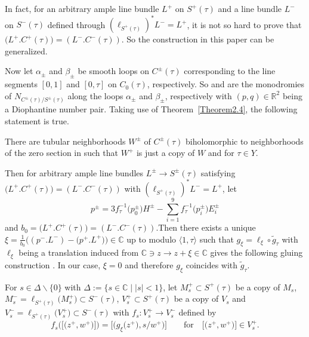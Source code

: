 \documentclass[10pt,a4paper]{amsart}
\numberwithin{equation}{section}
\begin{document}
In fact, for an arbitrary ample line bundle $L^+$ on $S^+(\tau)$ and a line bundle $L^-$ on $S^-(\tau)$ defined through $(\ell_{S^{+}(\tau)})^*L^{-}=L^{+}$, it is not so hard to prove that $\bigl(L^{+}.C^{+}(\tau)\bigr)=(L^{-}.C^{-}(\tau))$. So the construction in this paper can be generalized.

Now let $\alpha_{\pm}$ and $\beta_{\pm}$ be smooth loops on $C^{\pm}(\tau)$ corresponding to the line segments $[0,1]$ and $[0,\tau]$ on $C_0(\tau)$, respectively. So  and  are the monodromies of $N_{C^{\pm}(\tau)/S^{\pm}(\tau)}$ along the loops $\alpha_{\pm}$ and $\beta_{\pm}$, respectively with $(p,q) \in \mathbb{R}^2$ being a Diophantine number pair. Taking use of Theorem~\ref{Theorem2.4}, the following statement is true.

There are tubular neighborhoods $W^{\pm}$ of $C^{\pm}(\tau)$ biholomorphic to neighborhoods of the zero section in  such that $W^+$ is just a copy of $W$ and  for $\tau\in Y$.

Then for arbitrary ample line bundles $L^{\pm}\rightarrow S^{\pm}(\tau)$ satisfying $\bigl(L^{+}.C^{+}(\tau)\bigr)=(L^{-}.C^{-}(\tau))$ with $(\ell_{S^{+}(\tau)})^*L^{-}=L^{+}$, let
\[p^{\pm}=3f^{-1}_{\tau}\bigl(p_0^{\pm}\bigr)H^{\pm}-\sum_{i=1}^9f^{-1}_{\tau}\bigl(p_i^{\pm}\bigr)E^{\pm}_i\]
and $b_0=\bigl(L^{+}.C^{+}(\tau)\bigr)=(L^{-}.C^{-}(\tau))$.Then there exists a unique $\xi=\frac{1}{b_0}\bigl((p^-.L^-)-\bigl(p^+.L^+\bigr)\bigr)\in\mathbb{C}$ up to modulo $\langle1,\tau\rangle$ such that $g_{\xi}=\ell_{\xi}\circ\widetilde{g}_{\tau}$ with $\ell_{\xi}$ being a translation induced from $\mathbb{C}\ni z\rightarrow z+\xi\in\mathbb{C}$ gives the following gluing construction \cite[Proposition~5.1]{Takayuki-Takato2}. In our case, $\xi =0$ and therefore $g_{\xi}$ coincides with $\widetilde{g}_{\tau}$.

For $s\in \Delta \backslash \{0\}$ with $\Delta:=\{s\in \mathbb{C}\mid |s|<1\}$, let $M_s^+\subset S^+(\tau)$ be a copy of $M_s$, $M^-_s =\ell_{S^+(\tau)}\bigl(M^+_s\bigr) \subset S^-(\tau)$, $V^+_s \subset S^+(\tau)$ be a copy of $V_s$ and $V^-_s=\ell_{S^+(\tau)}\bigl(V^+_s\bigr) \subset S^-(\tau)$ with
$f_s\colon V^{+}_s \rightarrow V^{-}_s$ defined by
\[f_s\bigl(\big[\bigl(z^+,w^+\bigr)\big]\bigr)=\big[\bigl(g_{\xi}\bigl(z^+\bigr),s/w^+\bigr)\big] \qquad \text{for} \quad \big[\bigl(z^+,w^+\bigr)\big]\in V^+_s.\]
\end{document}
